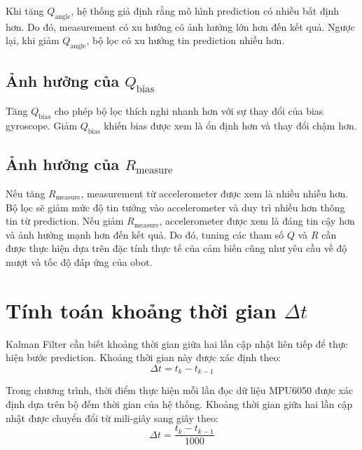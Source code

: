 Khi tăng $Q_{\text{angle}}$, hệ thống giả định rằng mô hình prediction có nhiều bất định hơn. Do đó, measurement có xu hướng có ảnh hưởng lớn hơn đến kết quả. Ngược lại, khi giảm $Q_{\text{angle}}$, bộ lọc có xu hướng tin prediction nhiều hơn.

\subsection{Ảnh hưởng của \texorpdfstring{$Q_{\text{bias}}$}{Q\_bias}}

Tăng $Q_{\text{bias}}$ cho phép bộ lọc thích nghi nhanh hơn với sự thay đổi của bias gyroscope. Giảm $Q_{\text{bias}}$ khiến bias được xem là ổn định hơn và thay đổi chậm hơn.

\subsection{Ảnh hưởng của \texorpdfstring{$R_{\text{measure}}$}{R\_measure}}

Nếu tăng $R_{\text{measure}}$, measurement từ accelerometer được xem là nhiều nhiễu hơn. Bộ lọc sẽ giảm mức độ tin tưởng vào accelerometer và duy trì nhiều hơn thông tin từ prediction. Nếu giảm $R_{\text{measure}}$, accelerometer được xem là đáng tin cậy hơn và ảnh hưởng mạnh hơn đến kết quả. Do đó, tuning các tham số $Q$ và $R$ cần được thực hiện dựa trên đặc tính thực tế của cảm biến cũng như yêu cầu về độ mượt và tốc độ đáp ứng của  obot.


\section{Tính toán khoảng thời gian \texorpdfstring{$\Delta t$}{Delta t}}
\label{sec:dt}

Kalman Filter cần biết khoảng thời gian giữa hai lần cập nhật liên tiếp để thực hiện bước prediction. Khoảng thời gian này được xác định theo:
\begin{equation}
\Delta t
=
t_k-t_{k-1}
\end{equation}

Trong chương trình, thời điểm thực hiện mỗi lần đọc dữ liệu MPU6050 được xác định dựa trên bộ đếm thời gian của hệ thống. Khoảng thời gian giữa hai lần cập nhật được chuyển đổi từ mili-giây sang giây theo:
\begin{equation}
\Delta t
=
\frac{t_k-t_{k-1}}{1000}
\end{equation}

